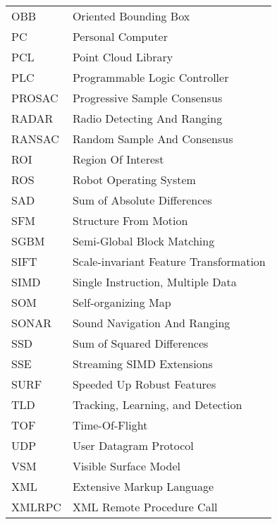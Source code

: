 \documentclass[12pt,a4paper,oneside,pdftex]{report}
\begin{document}
\begin{longtable}{@{}p{}p{}@{}}
OBB & Oriented Bounding Box \\
PC & Personal Computer \\
PCL & Point Cloud Library \\
PLC & Programmable Logic Controller \\
PROSAC & Progressive Sample Consensus \\
RADAR & Radio Detecting And Ranging \\
RANSAC & Random Sample And Consensus \\
ROI & Region Of Interest \\
ROS & Robot Operating System \\
SAD & Sum of Absolute Differences \\
SFM & Structure From Motion \\
SGBM & Semi-Global Block Matching \\
SIFT & Scale-invariant Feature Transformation \\
SIMD & Single Instruction, Multiple Data \\
SOM & Self-organizing Map \\
SONAR & Sound Navigation And Ranging \\
SSD & Sum of Squared Differences \\
SSE & Streaming SIMD Extensions \\
SURF & Speeded Up Robust Features \\
TLD & Tracking, Learning, and Detection \\
TOF & Time-Of-Flight \\
UDP & User Datagram Protocol \\
VSM & Visible Surface Model \\
XML & Extensive Markup Language \\
XMLRPC & XML Remote Procedure Call \\ 
\end{longtable}



\label{pages-prelude}
\cleardoublepage
\end{document}
